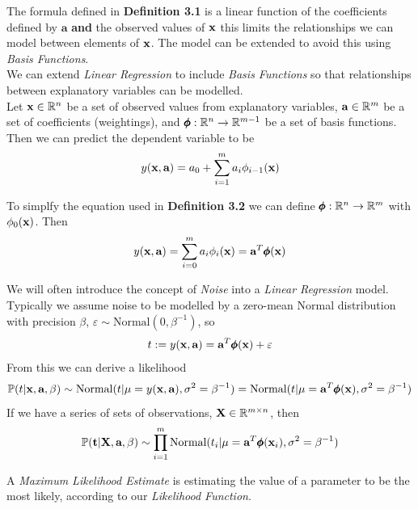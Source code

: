 \documentclass[11pt,a4paper]{article}
\begin{document}
The formula defined in \textbf{Definition 3.1} is a linear function of the coefficients defined by $\textbf{a}$ \textbf{and} the observed values of $\textbf{x}$ this limits the relationships we can model between elements of $\textbf{x}$. The model can be extended to avoid this using \textit{Basis Functions}.\\

We can extend \textit{Linear Regression} to include \textit{Basis Functions} so that relationships between explanatory variables can be modelled.\\
Let $\textbf{x}\in\mathbb{R}^n$ be a set of observed values from explanatory variables, $\textbf{a}\in\mathbb{R}^{m}$ be a set of coefficients (weightings), and $\pmb{\phi}:\mathbb{R}^n\to\mathbb{R}^{m-1}$ be a set of basis functions. Then we can predict the dependent variable to be
$$y(\textbf{x},\textbf{a})=a_0+\sum_{i=1}^ma_i\phi_{i-1}(\textbf{x})$$

To simplfy the equation used in \textbf{Definition 3.2} we can define $\pmb{\phi}:\mathbb{R}^n\to\mathbb{R}^m$ with $\phi_0(\textbf{x})$. Then
$$y(\textbf{x},\textbf{a})=\sum_{i=0}^ma_i\phi_i(\textbf{x})=\textbf{a}^T\pmb{\phi}(\textbf{x})$$

We will often introduce the concept of \textit{Noise} into a \textit{Linear Regression} model. Typically we assume noise to be modelled by a zero-mean Normal distribution with precision $\beta$, $\varepsilon\sim\text{Normal}(0,\beta^{-1})$, so
$$t:=y(\textbf{x},\textbf{a})=\textbf{a}^T\pmb{\phi}(\textbf{x})+\varepsilon$$
From this we can derive a likelihood
$$\mathbb{P}(t|\textbf{x},\textbf{a},\beta)\sim\text{Normal}(t|\mu=y(\textbf{x},\textbf{a}),\sigma^2=\beta^{-1})=\text{Normal}(t|\mu=\textbf{a}^T\pmb{\phi}(\textbf{x}),\sigma^2=\beta^{-1})$$
If we have a series of sets of observations, $\textbf{X}\in\mathbb{R}^{m\times n}$, then
$$\mathbb{P}(\textbf{t}|\textbf{X},\textbf{a},\beta)\sim\prod\limits_{i=1}^m\text{Normal}(t_i|\mu=\textbf{a}^T\pmb{\phi}(\textbf{x}_i),\sigma^2=\beta^{-1})$$

A \textit{Maximum Likelihood Estimate} is estimating the value of a parameter to be the most likely, according to our \textit{Likelihood Function}.\\
\end{document}
